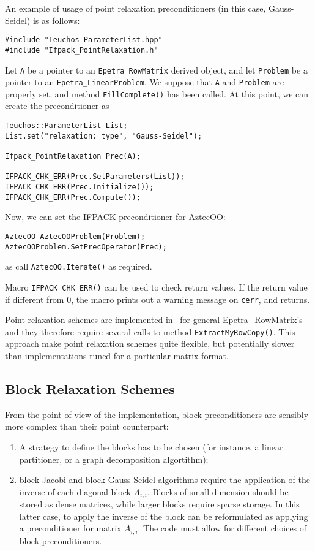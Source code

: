 An example of usage of point relaxation preconditioners (in this case, Gauss-Seidel) is as
follows:
\begin{verbatim}
#include "Teuchos_ParameterList.hpp"
#include "Ifpack_PointRelaxation.h"
\end{verbatim}
Let \verb!A! be a pointer to an \verb!Epetra_RowMatrix! derived object,
  and let \verb!Problem! be a pointer to an \verb!Epetra_LinearProblem!.
We suppose that \verb!A! and 
\verb!Problem! are properly set, and
method \verb~FillComplete()~ has been called. At this point, we can create the
preconditioner as
\begin{verbatim}
Teuchos::ParameterList List;
List.set("relaxation: type", "Gauss-Seidel");

Ifpack_PointRelaxation Prec(A);

IFPACK_CHK_ERR(Prec.SetParameters(List));
IFPACK_CHK_ERR(Prec.Initialize());
IFPACK_CHK_ERR(Prec.Compute());
\end{verbatim}
Now, we can set the IFPACK preconditioner for AztecOO:
\begin{verbatim}
AztecOO AztecOOProblem(Problem);
AztecOOProblem.SetPrecOperator(Prec);
\end{verbatim}
as call \verb!AztecOO.Iterate()! as required.

Macro \verb!IFPACK_CHK_ERR()! can be used to check return values. If the
return value if different from 0, the macro prints out a warning message on
\verb!cerr!, and returns.

\begin{remark}
Point relaxation schemes are implemented in \ifpack\ for general
Epetra\_RowMatrix's and they therefore require several calls to method
\verb!ExtractMyRowCopy()!. This approach make point relaxation schemes quite
flexible, but potentially slower than implementations tuned for a particular
matrix format.
\end{remark}

\subsection{Block Relaxation Schemes}
\label{sec:block_ex}

From the point of view of the implementation, block preconditioners
are sensibly more complex than their point counterpart:
\begin{enumerate}
\item A strategy to define the blocks has to be chosen (for instance, 
a linear partitioner, or a graph decomposition algortithm);
\item block Jacobi and block Gauss-Seidel algorithms require the application
of the inverse of each diagonal block $A_{i,i}$. Blocks of small dimension
should be stored as dense matrices, while larger blocks require sparse
storage. In this latter case, to apply the inverse of the block can be
reformulated as applying a preconditioner for matrix
$A_{i,i}$.
The code must allow for different choices of block preconditioners.
\end{enumerate}


